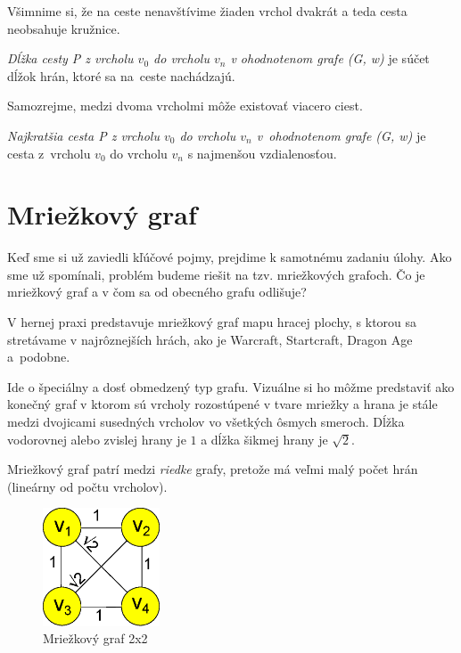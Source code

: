 Všimnime si, že na ceste nenavštívime žiaden vrchol dvakrát a teda cesta neobsahuje kružnice.


\begin{define}
{\sl Dĺžka cesty P z vrcholu $v_0$ do vrcholu $v_n$ v ohodnotenom grafe (G, w) } je súčet dĺžok hrán, ktoré sa na~ceste nachádzajú.
\end{define}

Samozrejme, medzi dvoma vrcholmi môže existovať viacero ciest.

\begin{define}
{\sl Najkratšia cesta P z vrcholu $v_0$ do vrcholu $v_n$
v~ohodnotenom grafe (G, w)} 
je cesta z~vrcholu $v_0$ do vrcholu $v_n$ s najmenšou vzdialenosťou. 
\end{define}


\section{Mriežkový graf}

Keď sme si už zaviedli kľúčové pojmy, prejdime k samotnému
zadaniu úlohy.
Ako sme už spomínali, problém budeme riešit na tzv. mriežkových grafoch. Čo je mriežkový graf a v čom sa od obecného grafu odlišuje?

V hernej praxi predstavuje mriežkový graf mapu hracej plochy, s ktorou sa stretávame v najrôznejších hrách, ako je Warcraft, Startcraft, Dragon Age
a~podobne.

Ide o špeciálny a dosť obmedzený typ grafu. Vizuálne si ho môžme predstaviť ako konečný graf v ktorom sú vrcholy rozostúpené v tvare mriežky a hrana
je stále medzi dvojicami susedných vrcholov vo všetkých ôsmych smeroch. Dĺžka vodorovnej alebo zvislej hrany je $1$ a dĺžka šikmej hrany je $\sqrt{2}$.

\begin{note}
Mriežkový graf patrí medzi {\sl riedke} grafy,
pretože má veľmi malý počet hrán (lineárny od počtu vrcholov).
\end{note}

\begin{figure}[h]
\centering
\includegraphics[height=3.5cm]{./img/mriezkovy_graf2x2.eps}
\caption{Mriežkový graf 2x2}
\label{fig:mriezkovy_graf2x2}
\end{figure}


